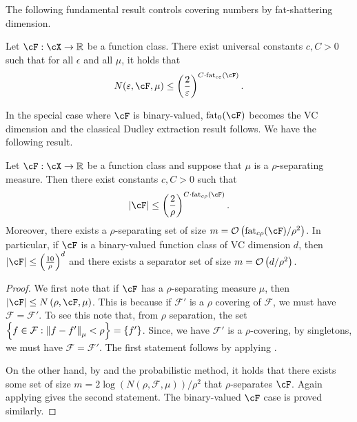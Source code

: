     The following fundamental result controls covering numbers by fat-shattering dimension.
    \begin{theorem}\label{thm:mendelson}
        Let $\cF: \cX \to \rr$ be a function class.  There exist universal constants $c, C > 0$ such that for all $\epsilon$ and all $\mu$, it holds that
        \begin{align}
            N(\epsilon, \cF, \mu) \leq \left( \frac 2\epsilon \right)^{C\cdot \fat_{c \epsilon}(\cF)}.
        \end{align}
    \end{theorem}
    In the special case where $\cF$ is binary-valued, $\fat_0(\cF)$ becomes the VC dimension and the classical Dudley extraction result \citep{dudley1969speed} follows.  We have the following result.

    \begin{lemma}
        Let $\cF: \cX \to \rr$ be a function class and suppose that $\mu$ is a $\rho$-separating measure.  Then there exist constants $c, C > 0$ such that
        \begin{align}
            \abs{\cF} \leq \left( \frac 2 \rho \right)^{C \cdot \fat_{c \rho}(\cF)}.
        \end{align}
        Moreover, there exists a $\rho$-separating set of size $m = \bigO\left( \fat_{c \rho}(\cF) / \rho^2 \right)$.  In particular, if $\cF$ is a binary-valued function class of VC dimension $d$, then $\abs{\cF} \leq \left( \frac{10} \rho \right)^{d}$ and there exists a separator set of size $m = \mathcal{O}\left( d / \rho^2 \right)$.
    \end{lemma}
    \begin{proof}
        We first note that if $\cF$ has a $\rho$-separating measure $\mu$, then $\abs{\cF} \leq N\left( \rho, \cF, \mu \right)$.  This is because if $\mathcal{F}'$ is a $\rho$ covering of $\mathcal{F}$, we must have $\mathcal{F} = \mathcal{F}'$. 
        To see this note that, from $\rho$ separation, the set $ \left\{ f \in  \mathcal{F} : \left\|f - f'\right\|_{\mu} < \rho    \right\} = \{ f'\}    $. 
        Since, we have $\mathcal{F}'$ is a $\rho$-covering, by singletons, we must have $\mathcal{F} = \mathcal{F}'$.   The first statement follows by applying . 
        
        
        On the other hand, by  and the probabilistic method, it holds that there exists some set of size $m = 2 \log( N( \rho , \mathcal{F} , \mu )  ) / \rho^{2}$ that $\rho$-separates $\cF$.  Again applying  gives the second statement.  The binary-valued $\cF$ case is proved similarly.
    \end{proof}





